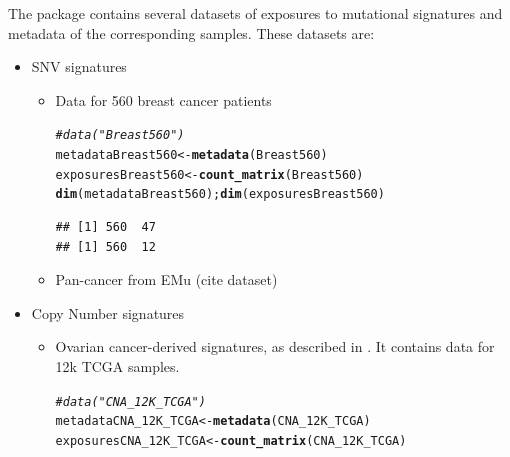 \documentclass{article}\usepackage[]{graphicx}\usepackage[]{color}
\makeatletter
\newcommand{\hlcom}[1]{\textcolor[rgb]{0.678,0.584,0.686}{\textit{#1}}}%
\newcommand{\hlstd}[1]{\textcolor[rgb]{0.345,0.345,0.345}{#1}}%
\newcommand{\hlkwb}[1]{\textcolor[rgb]{0.69,0.353,0.396}{#1}}%
\newcommand{\hlkwd}[1]{\textcolor[rgb]{0.737,0.353,0.396}{\textbf{#1}}}%
\newenvironment{kframe}{%
 \def\at@end@of@kframe{}%
 \ifinner\ifhmode%
  \def\at@end@of@kframe{\end{minipage}}%
  \begin{minipage}{\columnwidth}%
 \fi\fi%
 \def\FrameCommand##1{\hskip\@totalleftmargin \hskip-\fboxsep
 \colorbox{shadecolor}{##1}\hskip-\fboxsep
     \hskip-\linewidth \hskip-\@totalleftmargin \hskip\columnwidth}%
 \MakeFramed {\advance\hsize-\width
   \@totalleftmargin\z@ \linewidth\hsize
   \@setminipage}}%
 {\par\unskip\endMakeFramed%
 \at@end@of@kframe}
\newenvironment{knitrout}{}{} %
\makeatother
\begin{document}
The package contains several datasets of exposures to mutational signatures and metadata of the corresponding samples. These datasets are:
\begin{itemize}
\item SNV signatures
\begin{itemize}
\item Data for 560 breast cancer patients

\begin{knitrout}
\color{fgcolor}\begin{kframe}
\begin{alltt}
\hlcom{# data("Breast560")}
\hlstd{metadataBreast560} \hlkwb{<-} \hlkwd{metadata}\hlstd{(Breast560)}
\hlstd{exposuresBreast560} \hlkwb{<-} \hlkwd{count_matrix}\hlstd{(Breast560)}
\hlkwd{dim}\hlstd{(metadataBreast560);} \hlkwd{dim}\hlstd{(exposuresBreast560)}
\end{alltt}
\begin{verbatim}
## [1] 560  47
## [1] 560  12
\end{verbatim}
\end{kframe}
\end{knitrout}

\item Pan-cancer from EMu\cite{fischer2013emu} (cite dataset)
\end{itemize}
\item Copy Number signatures
\begin{itemize}
\item Ovarian cancer-derived signatures, as described in \cite{macintyre2018copy}. It contains data for 12k TCGA samples.

\begin{knitrout}
\color{fgcolor}\begin{kframe}
\begin{alltt}
\hlcom{#data("CNA_12K_TCGA")}
\hlstd{metadataCNA_12K_TCGA} \hlkwb{<-} \hlkwd{metadata}\hlstd{(CNA_12K_TCGA)}
\hlstd{exposuresCNA_12K_TCGA} \hlkwb{<-} \hlkwd{count_matrix}\hlstd{(CNA_12K_TCGA)}
\end{alltt}
\end{kframe}
\end{knitrout}


\end{itemize}
\end{itemize}
\end{document}
